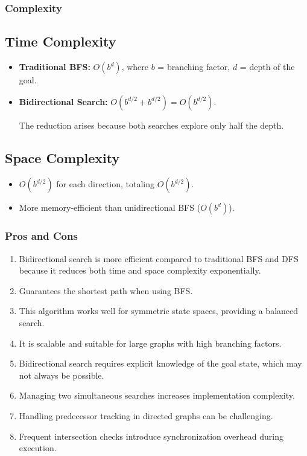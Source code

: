 		\subsubsection{Complexity}
		
		\subsection*{Time Complexity}
		\begin{itemize}
			\item \textbf{Traditional BFS:} $O(b^d)$, where $b$ = branching factor, $d$ = depth of the goal.
			\item \textbf{Bidirectional Search:} $O(b^{d/2} + b^{d/2}) = O(b^{d/2})$.
			
			The reduction arises because both searches explore only half the depth.
		\end{itemize}
		
		\subsection*{Space Complexity}
		\begin{itemize}
			\item $O(b^{d/2})$ for each direction, totaling $O(b^{d/2})$. 
			\item More memory-efficient than unidirectional BFS ($O(b^d)$).
		\end{itemize}
	
		\subsubsection{Pros and Cons}
		\begin{enumerate}
			\item Bidirectional search is more efficient compared to traditional BFS and DFS because it reduces both time and space complexity exponentially.
			\item Guarantees the shortest path when using BFS.
			\item This algorithm works well for symmetric state spaces, providing a balanced search.
			\item It is scalable and suitable for large graphs with high branching factors.\\
			
			
			\item Bidirectional search requires explicit knowledge of the goal state, which may not always be possible.
			\item Managing two simultaneous searches increases implementation complexity.
			\item Handling predecessor tracking in directed graphs can be challenging.
			\item Frequent intersection checks introduce synchronization overhead during execution.
		\end{enumerate}
